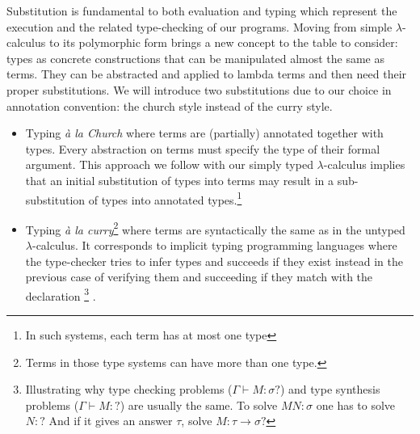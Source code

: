 \documentclass{article}
\begin{document}
    
    Substitution is fundamental to both evaluation and typing which represent the execution and the related type-checking of our programs. Moving from simple $\lambda$-calculus to its polymorphic form brings a new concept to the table to consider: types as concrete constructions that can be manipulated almost the same as terms. They can be abstracted and applied to lambda terms and then need their proper substitutions. We will introduce two substitutions due to our choice in annotation convention: the church style instead of the curry style.
    \begin{itemize}
        \item Typing \textit{à la Church} where terms are (partially) annotated together with types. Every abstraction on terms must specify the type of their formal argument. This approach we follow with our simply typed $\lambda$-calculus implies that an initial substitution of types into terms may result in a sub-substitution of types into annotated types.\footnote{In such systems, each term has at most one type}

        \item Typing \textit{à la curry}\footnote{Terms in those type systems can have more than one type.} where terms are syntactically the same as in the untyped $\lambda$-calculus. It corresponds to implicit typing programming languages where the type-checker tries to infer types and succeeds if they exist instead in the previous case of verifying them and succeeding if they match with the declaration
        \footnote{Illustrating why type checking problems ($\Gamma\vdash M : \sigma ?$) and type synthesis problems ($\Gamma\vdash M :  ?$) are usually the same. To solve $M N : \sigma$ one has to solve $N : ?$ And if it gives an answer $\tau$, solve $M:\tau\rightarrow\sigma ?$}
        .
    \end{itemize}
\end{document}
